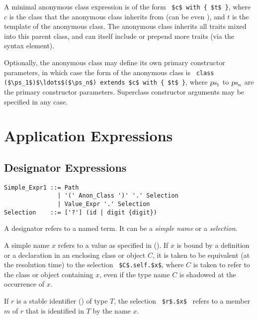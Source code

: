 A minimal anonymous class expression is of the form ~\lstinline!$c$ with { $t$ }!, where $c$ is the class that the anonymous class inherits from (can be even ), and $t$ is the template of the anonymous class. The anonymous class inherits all traits mixed into this parent class, and can itself include or prepend more traits (via the  syntax element). 

Optionally, the anonymous class may define its own primary constructor parameters, in which case the form of the anonymous class is ~\lstinline!class ($\ps_1$)$\ldots$($\ps_n$) extends $c$ with { $t$ }!, where $\mbox{\sl ps}_1$ to $\mbox{\sl ps}_n$ are the primary constructor parameters. Superclass constructor arguments may be specified in any case. 






\section{Application Expressions}







\subsection{Designator Expressions}
\label{sec:designators}

\syntax\begin{lstlisting}
Simple_Expr1 ::= Path
               | '(' Anon_Class ')' '.' Selection
               | Value_Expr '.' Selection
Selection    ::= ['?'] (id | digit {digit})
\end{lstlisting}

A designator refers to a named term. It can be a {\em simple name} or a {\em selection}.

A simple name $x$ refers to a value as specified in (). If $x$ is bound by a definition or a declaration in an enclosing class or object $C$, it is taken to be equivalent (at the resolution time) to the selection ~\lstinline!$C$.self.$x$!, where $C$ is taken to refer to the class or object containing $x$, even if the type name $C$ is shadowed at the occurrence of $x$. 

If $r$ is a stable identifier () of type $T$, the selection ~\lstinline!$r$.$x$!~ refers to a member $m$ of $r$ that is identified in $T$ by the name $x$. 

